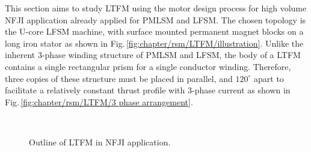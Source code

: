         
        This section aims to study \acs{LTFM} using the motor design process for high volume \acs{NFJI} application already applied for \acs{PMLSM} and \acs{LFSM}. The chosen topology is the U-core \acs{LFSM} machine, with surface mounted permanent magnet blocks on a long iron stator as shown in Fig.\,\ref{fig:chapter/rsm/LTFM/illustration}. Unlike the inherent 3-phase winding structure of \acs{PMLSM} and \acs{LFSM}, the body of a \acs{LTFM} contains a single rectangular prism for a single conductor winding. Therefore, three copies of these structure must be placed in parallel, and $120^\circ$ apart to facilitate a relatively constant thrust profile with 3-phase current as shown in Fig.\,\ref{fig:chapter/rsm/LTFM/3 phase arrangement}. 
        
        
        \begin{figure}[!ht]
            \centering
            \\
            \caption{Outline of \acs{LTFM} in \acs{NFJI} application.}
            \label{fig:chapter/rsm/LTFM/3-phase and NFJI}
        \end{figure}
        

